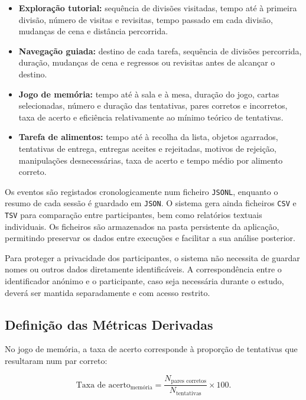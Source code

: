 \documentclass[12pt,a4paper,oneside]{report}
\begin{document}
\begin{itemize}
    \item \textbf{Exploração tutorial:} sequência de divisões visitadas, tempo até à primeira divisão, número de visitas e revisitas, tempo passado em cada divisão, mudanças de cena e distância percorrida.
    \item \textbf{Navegação guiada:} destino de cada tarefa, sequência de divisões percorrida, duração, mudanças de cena e regressos ou revisitas antes de alcançar o destino.
    \item \textbf{Jogo de memória:} tempo até à sala e à mesa, duração do jogo, cartas selecionadas, número e duração das tentativas, pares corretos e incorretos, taxa de acerto e eficiência relativamente ao mínimo teórico de tentativas.
    \item \textbf{Tarefa de alimentos:} tempo até à recolha da lista, objetos agarrados, tentativas de entrega, entregas aceites e rejeitadas, motivos de rejeição, manipulações desnecessárias, taxa de acerto e tempo médio por alimento correto.
\end{itemize}

Os eventos são registados cronologicamente num ficheiro \texttt{JSONL}, enquanto o resumo de cada sessão é guardado em \texttt{JSON}. O sistema gera ainda ficheiros \texttt{CSV} e \texttt{TSV} para comparação entre participantes, bem como relatórios textuais individuais. Os ficheiros são armazenados na pasta persistente da aplicação, permitindo preservar os dados entre execuções e facilitar a sua análise posterior.

Para proteger a privacidade dos participantes, o sistema não necessita de guardar nomes ou outros dados diretamente identificáveis. A correspondência entre o identificador anónimo e o participante, caso seja necessária durante o estudo, deverá ser mantida separadamente e com acesso restrito.

\subsection{Definição das Métricas Derivadas}

No jogo de memória, a taxa de acerto corresponde à proporção de tentativas que resultaram num par correto:

\begin{equation}
\text{Taxa de acerto}_{\text{memória}} =
\frac{N_{\text{pares corretos}}}{N_{\text{tentativas}}}\times 100.
\end{equation}
\end{document}
